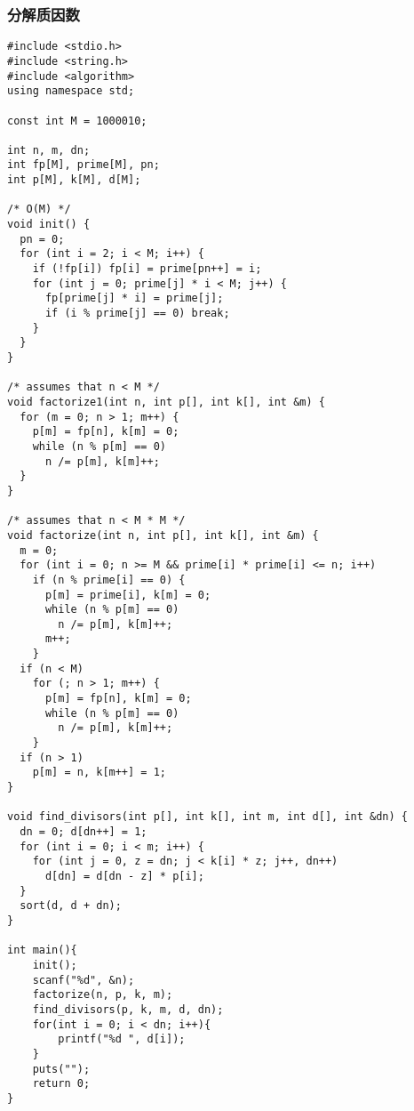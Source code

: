 \subsubsection{分解质因数}
\begin{verbatim}
#include <stdio.h>
#include <string.h>
#include <algorithm>
using namespace std;

const int M = 1000010;

int n, m, dn;
int fp[M], prime[M], pn;
int p[M], k[M], d[M];

/* O(M) */
void init() {
  pn = 0;
  for (int i = 2; i < M; i++) {
    if (!fp[i]) fp[i] = prime[pn++] = i;
    for (int j = 0; prime[j] * i < M; j++) {
      fp[prime[j] * i] = prime[j];
      if (i % prime[j] == 0) break;
    }
  }
}

/* assumes that n < M */
void factorize1(int n, int p[], int k[], int &m) {
  for (m = 0; n > 1; m++) {
    p[m] = fp[n], k[m] = 0;
    while (n % p[m] == 0) 
      n /= p[m], k[m]++;
  }
}

/* assumes that n < M * M */
void factorize(int n, int p[], int k[], int &m) {
  m = 0;
  for (int i = 0; n >= M && prime[i] * prime[i] <= n; i++)
    if (n % prime[i] == 0) {
      p[m] = prime[i], k[m] = 0;
      while (n % p[m] == 0)
        n /= p[m], k[m]++;
      m++;
    }
  if (n < M)
    for (; n > 1; m++) {
      p[m] = fp[n], k[m] = 0;
      while (n % p[m] == 0) 
        n /= p[m], k[m]++;
    }
  if (n > 1)
    p[m] = n, k[m++] = 1;
}

void find_divisors(int p[], int k[], int m, int d[], int &dn) {
  dn = 0; d[dn++] = 1;
  for (int i = 0; i < m; i++) {
    for (int j = 0, z = dn; j < k[i] * z; j++, dn++)
      d[dn] = d[dn - z] * p[i];
  }
  sort(d, d + dn);
}

int main(){
	init();
	scanf("%d", &n);
	factorize(n, p, k, m);
	find_divisors(p, k, m, d, dn);
	for(int i = 0; i < dn; i++){
		printf("%d ", d[i]);
	}
	puts("");
	return 0;
}
\end{verbatim}
